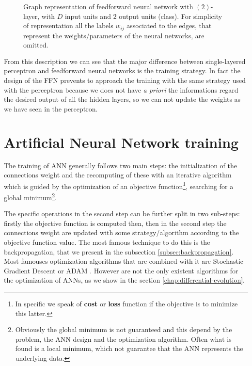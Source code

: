 \begin{figure}[t]
	\caption[Graph representation of feedforward neural network.]{Graph representation of feedforward neural network with $(2)$-layer, with $D$ input units and $2$ output units (class). For simplicity of representation all the labels $w_{ij}$ associated to the edges, that represent the weights/parameters of the neural networks, are omitted.}
	\label{fig:multilayer-perceptron}
\end{figure}

From this description we can see that the major difference between single-layered perceptron and feedforward neural networks is the training strategy. In fact the design of the FFN prevents to approach the training with the same strategy used with the perceptron because we does not have \textit{a priori} the informations regard the desired output of all the hidden layers, so we can not update the weights as we have seen in the perceptron.

\section{Artificial Neural Network training} 
The training of ANN generally follows two main steps: the initialization of the connections weight and the recomputing of these with an iterative algorithm which is guided by the optimization of an objective function\footnote{In specific we speak of \textbf{cost} or \textbf{loss} function if the objective is to minimize this latter.}, searching for a global minimum\footnote{Obviously the global minimum is not guaranteed and this depend by the problem, the ANN design and the optimization algorithm. Often what is found is a local minimum, which not guarantee that the ANN represents the underlying data.}.

The specific operations in the second step can be further split in two sub-steps: firstly the objective function is computed then, then in the second step the connections weight are updated with some strategy/algorithm according to the objective function value. The most famous technique to do this is the backpropagation, that we present in the subsection \ref{subsec:backpropagation}. Most famouses optimization algorithms that are combined with it are Stochastic Gradient Descent \cite{DeepLearning:2016} or ADAM \cite{Kingma2014AdamAM}. However are not the only existent algorithms for the optimization of ANNs, as we show in the section \ref{chap:differential-evolution}.

